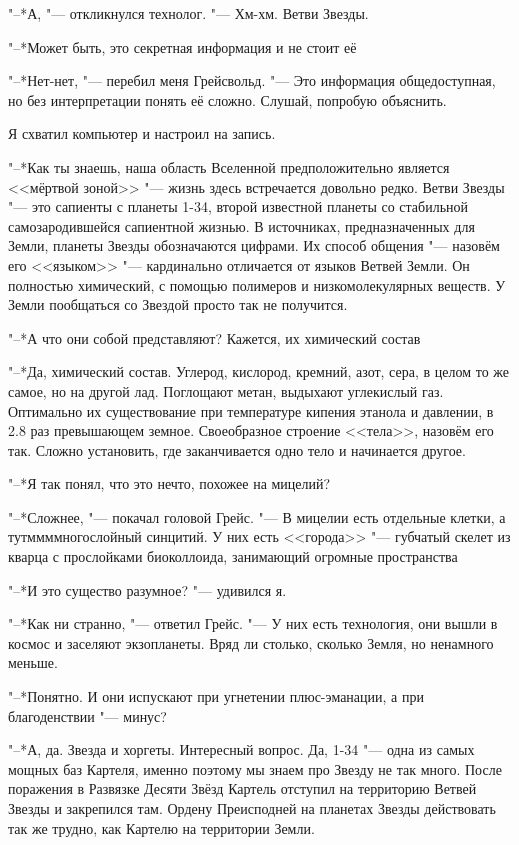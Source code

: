 "--*А, "--- откликнулся технолог.
"--- Хм-хм.
Ветви Звезды.

"--*Может быть, это секретная информация и не стоит её\ldotsq

"--*Нет-нет, "--- перебил меня Грейсвольд.
"--- Это информация общедоступная, но без интерпретации понять её сложно.
Слушай, попробую объяснить.

Я схватил компьютер и настроил на запись.

"--*Как ты знаешь, наша область Вселенной предположительно является <<мёртвой зоной>> "--- жизнь здесь встречается довольно редко.
Ветви Звезды "--- это сапиенты с планеты 1-34, второй известной планеты со стабильной самозародившейся сапиентной жизнью.
В источниках, предназначенных для Земли, планеты Звезды обозначаются цифрами.
Их способ общения "--- назовём его <<языком>> "--- кардинально отличается от языков Ветвей Земли.
Он полностью химический, с помощью полимеров и низкомолекулярных веществ.
У Земли пообщаться со Звездой просто так не получится.

"--*А что они собой представляют?
Кажется, их химический состав\ldotst

"--*Да, химический состав.
Углерод, кислород, кремний, азот, сера, в целом то же самое, но на другой лад.
Поглощают метан, выдыхают углекислый газ.
Оптимально их существование при температуре кипения этанола и давлении, в 2.8 раз превышающем земное.
Своеобразное строение <<тела>>, назовём его так.
Сложно установить, где заканчивается одно тело и начинается другое.

"--*Я так понял, что это нечто, похожее на мицелий?

"--*Сложнее, "--- покачал головой Грейс.
"--- В мицелии есть отдельные клетки, а тут\ldotst ммм\ldotst многослойный синцитий.
У них есть <<города>> "--- губчатый скелет из кварца с прослойками биоколлоида, занимающий огромные пространства\ldotst

"--*И это существо разумное? "--- удивился я.

"--*Как ни странно, "--- ответил Грейс.
"--- У них есть технология, они вышли в космос и заселяют экзопланеты.
Вряд ли столько, сколько Земля, но ненамного меньше.

"--*Понятно.
И они испускают при угнетении плюс-эманации, а при благоденствии "--- минус?

"--*А, да.
Звезда и хоргеты.
Интересный вопрос.
Да, 1-34 "--- одна из самых мощных баз Картеля, именно поэтому мы знаем про Звезду не так много.
После поражения в Развязке Десяти Звёзд Картель отступил на территорию Ветвей Звезды и закрепился там.
Ордену Преисподней на планетах Звезды действовать так же трудно, как Картелю на территории Земли.

